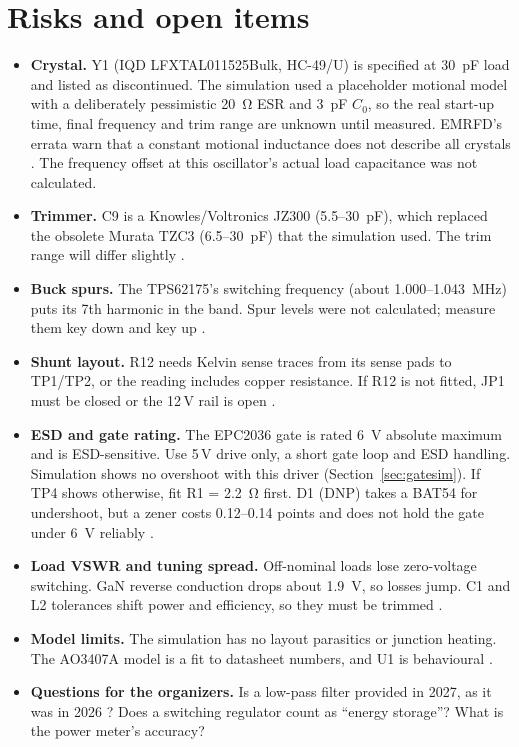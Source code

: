 \documentclass[11pt,letterpaper]{article}
\begin{document}
\section{Risks and open items}\label{sec:risks}
\begin{itemize}
\item \textbf{Crystal.} Y1 (IQD LFXTAL011525Bulk, HC-49/U) is specified at \SI{30}{\pico\farad} load and listed as discontinued. The simulation used a placeholder motional model with a deliberately pessimistic \SI{20}{\ohm} ESR and \SI{3}{\pico\farad} $C_0$, so the real start-up time, final frequency and trim range are unknown until measured. EMRFD's errata warn that a constant motional inductance does not describe all crystals \cite{emrfd,emrfderrata}. The frequency offset at this oscillator's actual load capacitance was not calculated.
\item \textbf{Trimmer.} C9 is a Knowles/Voltronics JZ300 (5.5--\SI{30}{\pico\farad}), which replaced the obsolete Murata TZC3 (6.5--\SI{30}{\pico\farad}) that the simulation used. The trim range will differ slightly \cite{knowlesJ}.
\item \textbf{Buck spurs.} The TPS62175's switching frequency (about 1.000--\SI{1.043}{\mega\hertz}) puts its 7th harmonic in the band. Spur levels were not calculated; measure them key down and key up \cite{tiTPS62175}.
\item \textbf{Shunt layout.} R12 needs Kelvin sense traces from its sense pads to TP1/TP2, or the reading includes copper resistance. If R12 is not fitted, JP1 must be closed or the 12\,V rail is open \cite{vishayWSK2512}.
\item \textbf{ESD and gate rating.} The EPC2036 gate is rated \SI{6}{\volt} absolute maximum and is ESD-sensitive. Use 5\,V drive only, a short gate loop and ESD handling. Simulation shows no overshoot with this driver (Section~\ref{sec:gatesim}). If TP4 shows otherwise, fit R1 = \SI{2.2}{\ohm} first. D1 (DNP) takes a BAT54 for undershoot, but a zener costs 0.12--0.14 points and does not hold the gate under \SI{6}{\volt} reliably \cite{epc2036ds,epcrel6,onsemiBZX84}.
\item \textbf{Load VSWR and tuning spread.} Off-nominal loads lose zero-voltage switching. GaN reverse conduction drops about \SI{1.9}{\volt}, so losses jump. C1 and L2 tolerances shift power and efficiency, so they must be trimmed \cite{epc2036ds,projnotes}.
\item \textbf{Model limits.} The simulation has no layout parasitics or junction heating. The AO3407A model is a fit to datasheet numbers, and U1 is behavioural \cite{projsim}.
\item \textbf{Questions for the organizers.} Is a low-pass filter provided in 2027, as it was in 2026 \cite{fdim2026rules}? Does a switching regulator count as ``energy storage''? What is the power meter's accuracy?
\end{itemize}
\end{document}
